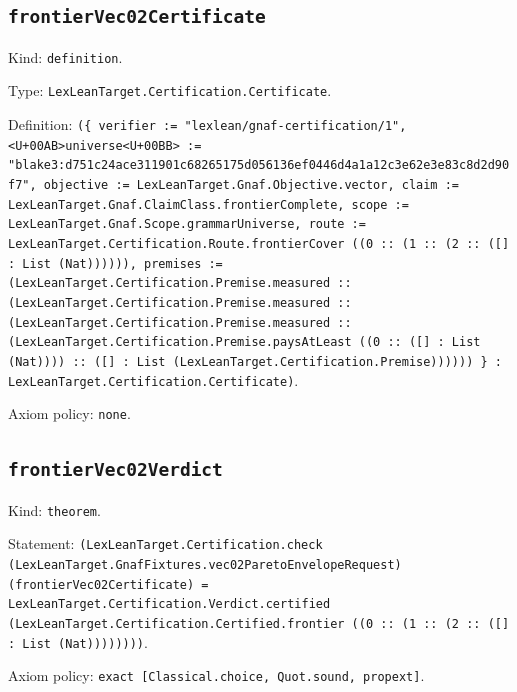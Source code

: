 \documentclass[11pt]{article}
\begin{document}
\subsection*{\texttt{frontierVec02Certificate}}
\noindent Kind: \texttt{definition}.\par
\noindent Type: \texttt{LexLeanTarget.Certification.Certificate}.\par
\noindent Definition: \texttt{(\{ verifier := "lexlean/gnaf-certification/1", <U+00AB>universe<U+00BB> := "blake3:d751c24ace311901c68265175d056136ef0446d4a1a12c3e62e3e83c8d2d90f7", objective := LexLeanTarget.Gnaf.Objective.vector, claim := LexLeanTarget.Gnaf.ClaimClass.frontierComplete, scope := LexLeanTarget.Gnaf.Scope.grammarUniverse, route := LexLeanTarget.Certification.Route.frontierCover ((0 :: (1 :: (2 :: ([] : List (Nat)))))), premises := (LexLeanTarget.Certification.Premise.measured :: (LexLeanTarget.Certification.Premise.measured :: (LexLeanTarget.Certification.Premise.measured :: (LexLeanTarget.Certification.Premise.paysAtLeast ((0 :: ([] : List (Nat)))) :: ([] : List (LexLeanTarget.Certification.Premise)))))) \} : LexLeanTarget.Certification.Certificate)}.\par
\noindent Axiom policy: \texttt{none}.\par
\subsection*{\texttt{frontierVec02Verdict}}
\noindent Kind: \texttt{theorem}.\par
\noindent Statement: \texttt{(LexLeanTarget.Certification.check (LexLeanTarget.GnafFixtures.vec02ParetoEnvelopeRequest) (frontierVec02Certificate) = LexLeanTarget.Certification.Verdict.certified (LexLeanTarget.Certification.Certified.frontier ((0 :: (1 :: (2 :: ([] : List (Nat))))))))}.\par
\noindent Axiom policy: \texttt{exact [Classical.choice, Quot.sound, propext]}.\par
\end{document}
